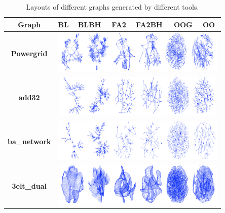 \documentclass[conference]{article}
\begin{document}
\FloatBarrier
\begin{table}[htbp]
\centering
\caption{Layouts of different graphs generated by different tools.}
\label{tab:layouts}

\begin{tabular}{|c|p{1.2cm}|p{1.4cm}|p{1.2cm}|p{1.4cm}|p{1.2cm}|p{1.2cm}|}
\hline
\textbf{Graph}   & \textbf{BL} & \textbf{BLBH} & \textbf{FA2} & \textbf{FA2BH} & \textbf{OOG} & \textbf{OO} \\ \hline
        \textbf{Powergrid} & \multicolumn{6}{|c|}{\includegraphics[height=2.05cm,width=0.8\linewidth]{layouts/powernetwork.png}}                                                                                                                \\ \hline
\textbf{add32}   & \multicolumn{6}{c|}{\includegraphics[height=2.05cm,width=0.8\linewidth]{layouts/add32.png}}                                                                                                                 \\ \hline
\textbf{ba\_network}        & \multicolumn{6}{c|}{\includegraphics[height=2.05cm,width=0.8\linewidth]{layouts/sf_6000.png}}                                                                                                                 \\ \hline
\textbf{3elt\_dual}        & \multicolumn{6}{c|}{\includegraphics[height=2.05cm,width=0.8\linewidth]{layouts/3elt_dual.png}}                                                                                                                 \\ \hline

\end{tabular}
\end{table}
\end{document}
